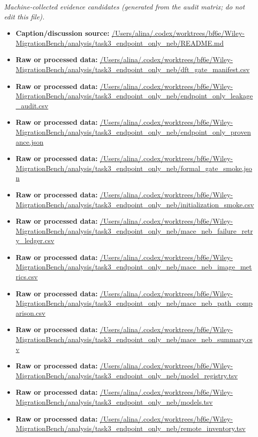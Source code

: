 \emph{Machine-collected evidence candidates (generated from the audit matrix; do not edit this file).}
\begin{itemize}[leftmargin=1.4em,noitemsep]
\item \textbf{Caption/discussion source:} \url{/Users/alina/.codex/worktrees/bf6e/Wiley-MigrationBench/analysis/task3_endpoint_only_neb/README.md}
\item \textbf{Raw or processed data:} \url{/Users/alina/.codex/worktrees/bf6e/Wiley-MigrationBench/analysis/task3_endpoint_only_neb/dft_gate_manifest.csv}
\item \textbf{Raw or processed data:} \url{/Users/alina/.codex/worktrees/bf6e/Wiley-MigrationBench/analysis/task3_endpoint_only_neb/endpoint_only_leakage_audit.csv}
\item \textbf{Raw or processed data:} \url{/Users/alina/.codex/worktrees/bf6e/Wiley-MigrationBench/analysis/task3_endpoint_only_neb/endpoint_only_provenance.json}
\item \textbf{Raw or processed data:} \url{/Users/alina/.codex/worktrees/bf6e/Wiley-MigrationBench/analysis/task3_endpoint_only_neb/formal_gate_smoke.json}
\item \textbf{Raw or processed data:} \url{/Users/alina/.codex/worktrees/bf6e/Wiley-MigrationBench/analysis/task3_endpoint_only_neb/initialization_smoke.csv}
\item \textbf{Raw or processed data:} \url{/Users/alina/.codex/worktrees/bf6e/Wiley-MigrationBench/analysis/task3_endpoint_only_neb/mace_neb_failure_retry_ledger.csv}
\item \textbf{Raw or processed data:} \url{/Users/alina/.codex/worktrees/bf6e/Wiley-MigrationBench/analysis/task3_endpoint_only_neb/mace_neb_image_metrics.csv}
\item \textbf{Raw or processed data:} \url{/Users/alina/.codex/worktrees/bf6e/Wiley-MigrationBench/analysis/task3_endpoint_only_neb/mace_neb_path_comparison.csv}
\item \textbf{Raw or processed data:} \url{/Users/alina/.codex/worktrees/bf6e/Wiley-MigrationBench/analysis/task3_endpoint_only_neb/mace_neb_summary.csv}
\item \textbf{Raw or processed data:} \url{/Users/alina/.codex/worktrees/bf6e/Wiley-MigrationBench/analysis/task3_endpoint_only_neb/model_registry.tsv}
\item \textbf{Raw or processed data:} \url{/Users/alina/.codex/worktrees/bf6e/Wiley-MigrationBench/analysis/task3_endpoint_only_neb/models.tsv}
\item \textbf{Raw or processed data:} \url{/Users/alina/.codex/worktrees/bf6e/Wiley-MigrationBench/analysis/task3_endpoint_only_neb/remote_inventory.tsv}

\end{itemize}
